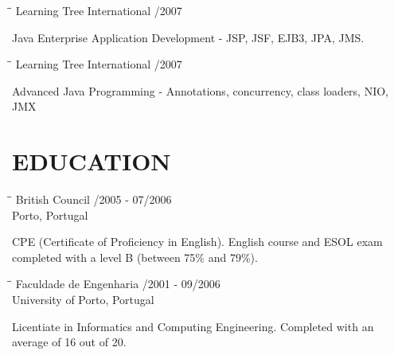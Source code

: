 \documentclass{res}
\begin{document}
\begin{resume}
\begin{tabbing}
\hspace{2.3in}\= \hspace{2.6in}\= \kill %
{\bf } \>Learning Tree International    
/2007\\ \>
\end{tabbing}\vspace{-20pt}
Java Enterprise Application Development - JSP, JSF, EJB3, JPA, JMS.

\begin{tabbing}
\hspace{2.3in}\= \hspace{2.6in}\= \kill %
{\bf } \>Learning Tree International    
/2007\\ \>
\end{tabbing}\vspace{-20pt}
Advanced Java Programming - Annotations, concurrency, class loaders, NIO, JMX

\section{EDUCATION}

\begin{tabbing}
\hspace{2.3in}\= \hspace{2.6in}\= \kill %
{\bf } \>British Council
/2005 - 07/2006\\ \>Porto, Portugal
\end{tabbing}\vspace{-20pt}
CPE (Certificate of Proficiency in English).
English course and ESOL exam completed with a level B (between 75\% and 79\%).

\begin{tabbing}
\hspace{2.3in}\= \hspace{2.6in}\= \kill %
{\bf } \>Faculdade de Engenharia
/2001 - 09/2006\\ \>University of Porto, Portugal
\end{tabbing}\vspace{-20pt}
Licentiate in Informatics and Computing Engineering.
Completed with an average of 16 out of 20.

\end{resume}
\end{document}
